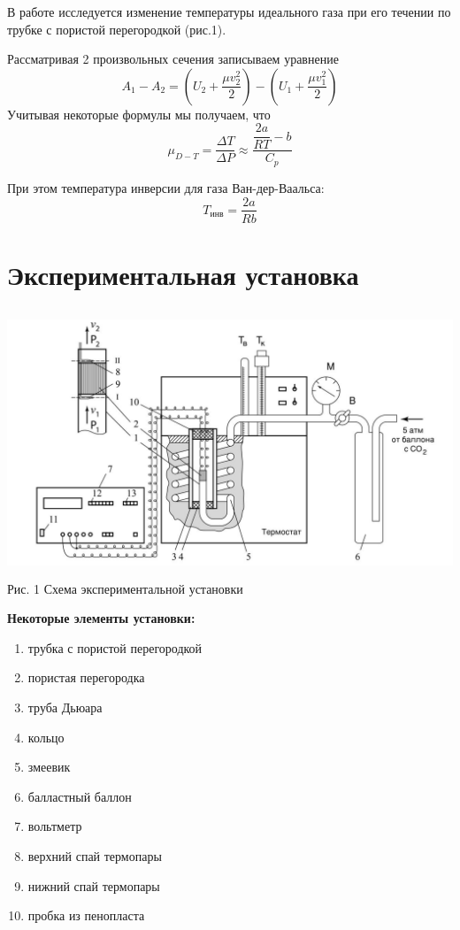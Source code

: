 \documentclass[a4paper, 12pt]{article}
\begin{document}
	В работе исследуется изменение температуры идеального газа при его течении по трубке с пористой перегородкой (рис.1). 
	
	Рассматривая 2 произвольных сечения записываем уравнение 
	\[A_1 - A_2 = \left( U_2 + \dfrac{\mu v_2^2}{2} \right) - \left( U_1 + \dfrac{\mu v_1^2}{2} \right) \]
	Учитывая некоторые формулы мы получаем, что 
	\[\mu_{D-T} = \dfrac{\Delta T}{\Delta P} \approx \dfrac{\dfrac{2a}{RT} - b}{C_p} \]
	
	При этом температура инверсии для газа Ван-дер-Ваальса:
	\[ T_{\text{инв}} = \frac{2a}{Rb} \]
	
	\section{Экспериментальная установка}
		\begin{center}
		\includegraphics[width=14cm, height=8cm]{"1.jpg"}\\
		Рис. 1 Схема экспериментальной установки\\
		\end{center}
	
	\textbf{Некоторые элементы установки:}
	\begin{enumerate}
		\item трубка с пористой перегородкой 
		\item пористая перегородка
		\item труба Дьюара
		\item кольцо
		\item змеевик
		\item балластный баллон
		\item вольтметр
		\item верхний спай термопары
		\item нижний спай термопары
		\item пробка из пенопласта
	\end{enumerate}
	
\end{document}
